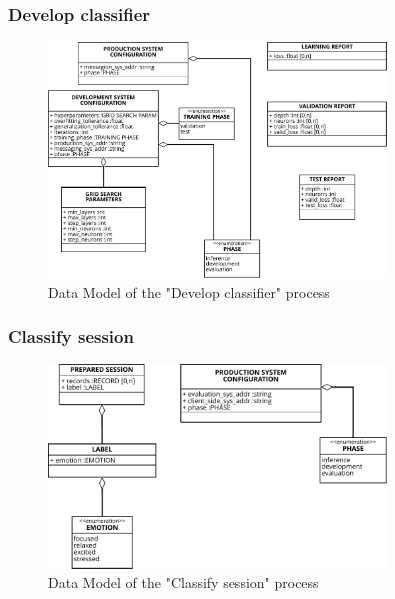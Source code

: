 \subsubsection{Develop classifier}
\label{sec:data_develop_classifier}

\begin{figure}[H]
\centering
\includegraphics[width=0.8\textwidth]{figures/Data Model - Develop Classifier.pdf}
\caption{Data Model of the "Develop classifier" process}
\label{fig:data_develop_classifier}
\end{figure}

\subsubsection{Classify session}
\label{sec:data_classify_session}

\begin{figure}[H]
\centering
\includegraphics[width=0.8\textwidth]{figures/Data Model - Classify Session.pdf}
\caption{Data Model of the "Classify session" process}
\label{fig:data_classify_session}
\end{figure}

